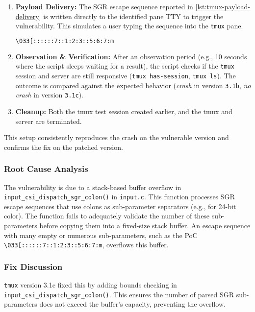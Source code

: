 \begin{enumerate}
	\item \textbf{Payload Delivery:} The SGR escape sequence reported in \autoref{lst:tmux-payload-delivery} is written directly to the identified pane TTY to trigger the vulnerability. This simulates a user typing the sequence into the \texttt{tmux} pane.

	      \begin{lstlisting}[language=bash, caption=Payload delivery to the tmux pane, label={lst:tmux-payload-delivery}]
\033[::::::7::1:2:3::5:6:7:m
\end{lstlisting}

	\item \textbf{Observation \& Verification:} After an observation period (e.g., 10 seconds where the script sleeps waiting for a result), the script checks if the \texttt{tmux} session and server are still responsive (\texttt{tmux has-session}, \texttt{tmux ls}). The outcome is compared against the expected behavior (\emph{crash} in version \texttt{3.1b}, \emph{no crash} in version \texttt{3.1c}).

	\item \textbf{Cleanup:} Both the tmux test session created earlier, and the tmux and server are terminated.
\end{enumerate}

This setup consistently reproduces the crash on the vulnerable version and confirms the fix on the patched version.

\subsubsection{Root Cause Analysis}

The vulnerability is due to a stack-based buffer overflow in \texttt{input\_csi\_dispatch\_sgr\_colon()} in \texttt{input.c}. This function processes SGR escape sequences that use colons as sub-parameter separators (e.g., for 24-bit color). The function fails to adequately validate the number of these sub-parameters before copying them into a fixed-size stack buffer. An escape sequence with many empty or numerous sub-parameters, such as the PoC \texttt{\textbackslash{}033[::::::7::1:2:3::5:6:7:m}, overflows this buffer.

\subsubsection{Fix Discussion}

\texttt{tmux} version 3.1c fixed this by adding bounds checking in \texttt{input\_csi\_dispatch\_sgr\_colon()}. This ensures the number of parsed SGR sub-parameters does not exceed the buffer's capacity, preventing the overflow.

